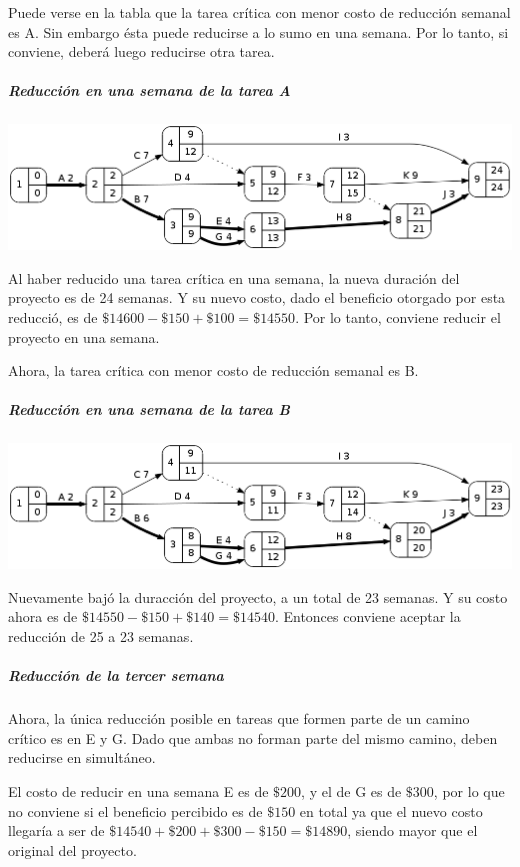 \documentclass[a4paper,10pt]{article}
\begin{document}
   Puede verse en la tabla que la tarea crítica con menor costo de reducción semanal es A. Sin embargo ésta puede reducirse a lo sumo en una semana. Por lo tanto, si conviene, deberá luego reducirse otra tarea.

  \subparagraph {Reducción en una semana de la tarea A}
  \begin{center}
    \includegraphics[scale=0.4,keepaspectratio=true]{img/ej3-1.png} 
  \end{center}

  Al haber reducido una tarea crítica en una semana, la nueva duración del proyecto es de 24 semanas. Y su nuevo costo, dado el beneficio otorgado por esta reducció, es de $\$14600 - \$150 + \$100 = \$14550$. Por lo tanto, conviene reducir el proyecto en una semana.


  Ahora, la tarea crítica con menor costo de reducción semanal es B.

  \subparagraph {Reducción en una semana de la tarea B}
  \begin{center}
    \includegraphics[scale=0.4,keepaspectratio=true]{img/ej3-2.png} 
  \end{center}

  Nuevamente bajó la duracción del proyecto, a un total de 23 semanas. Y su costo ahora es de $\$14550 - \$150 + \$140 = \$14540$. Entonces conviene aceptar la reducción de 25 a 23 semanas.

  \subparagraph {Reducción de la tercer semana}
  Ahora, la única reducción posible en tareas que formen parte de un camino crítico es en E y G. Dado que ambas no forman parte del mismo camino, deben reducirse en simultáneo.

  El costo de reducir en una semana E es de $\$200$, y el de G es de $\$300$, por lo que no conviene si el beneficio percibido es de $\$150$ en total ya que el nuevo costo llegaría a ser de $\$14540 + \$200 + \$300 - \$150 = \$14890$, siendo mayor que el original del proyecto.
\end{document}
